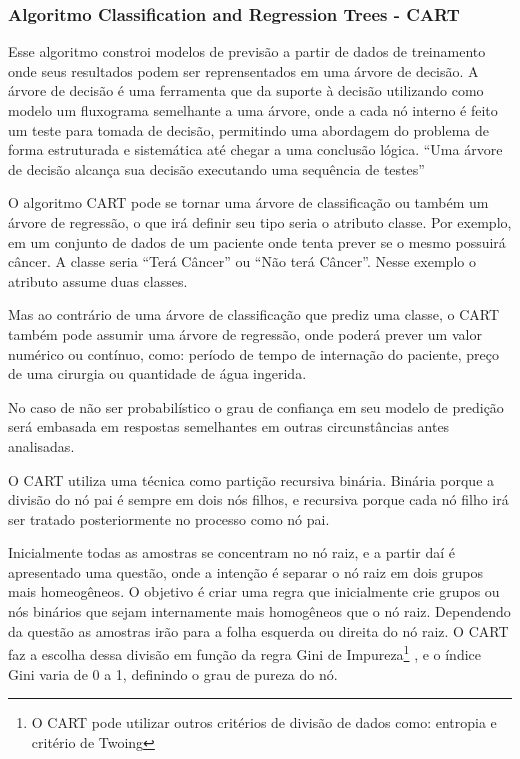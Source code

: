 \subsubsection{Algoritmo Classification and Regression Trees  - CART}\label{cap:refTeor:sssec:cart}


Esse algoritmo constroi modelos de previsão a partir de dados de treinamento onde seus resultados podem ser reprensentados em uma árvore de decisão. A árvore de decisão é uma ferramenta que da suporte à decisão utilizando como modelo um fluxograma semelhante a uma árvore, onde a cada nó interno é feito um teste para tomada de decisão, permitindo uma abordagem do problema de forma estruturada e sistemática até chegar a uma conclusão lógica. ``Uma árvore de decisão alcança sua decisão executando uma sequência de testes'' \cite[p. 811]{RusselStuart.Norvig2013}

O algoritmo CART pode se tornar uma árvore de classificação ou também um árvore de regressão, o que irá definir seu tipo seria o atributo classe. Por exemplo, em um conjunto de dados de um paciente onde tenta prever se o mesmo possuirá câncer. A classe seria ``Terá Câncer'' ou ``Não terá Câncer''. Nesse exemplo o atributo assume duas classes.

Mas ao contrário de uma árvore de classificação que prediz uma classe, o CART também pode assumir uma árvore de regressão, onde poderá prever um valor numérico ou contínuo, como: período de tempo de internação do paciente, preço de uma cirurgia ou quantidade de água ingerida. 

No caso de não ser probabilístico o grau de confiança em seu modelo de predição será embasada em respostas semelhantes em outras circunstâncias antes analisadas. 

O CART utiliza uma técnica como partição recursiva binária. Binária porque a divisão do nó pai é sempre em dois nós filhos, e recursiva porque cada nó filho irá ser tratado posteriormente no processo como nó pai.

Inicialmente todas as amostras se concentram no nó raiz, e a partir daí é apresentado uma questão, onde a intenção é separar o nó raiz em dois grupos mais homeogêneos. O objetivo é criar uma regra que inicialmente crie grupos ou nós binários que sejam internamente mais homogêneos que o nó raiz. Dependendo da questão as amostras irão para a folha esquerda ou direita do nó raiz. O CART faz a escolha dessa divisão em função da regra Gini de Impureza\footnote{O CART pode utilizar outros critérios de divisão de dados como: entropia e critério de Twoing} \cite{breiman1984}, e o índice Gini varia de 0 a 1, definindo o grau de pureza do nó. 

